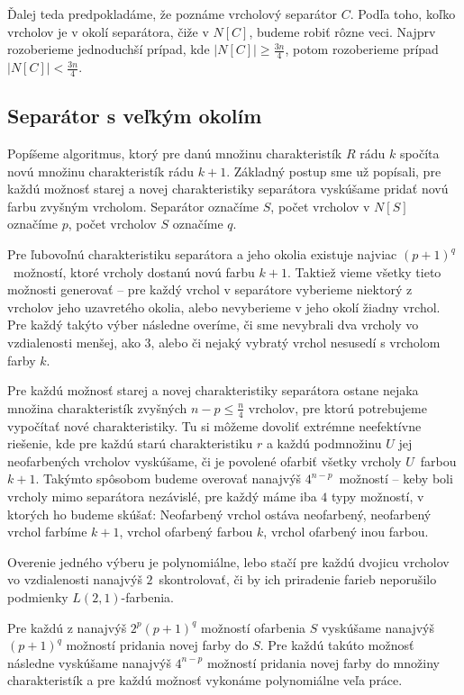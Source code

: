 Ďalej teda predpokladáme, že poznáme vrcholový separátor $C$. Podľa toho, koľko vrcholov je v okolí separátora, čiže
v $N[C]$, budeme robiť rôzne veci. Najprv rozoberieme jednoduchší prípad, kde $|N[C]| \ge \frac{3n}{4}$,
potom rozoberieme prípad $|N[C]| < \frac{3n}{4}$.

\subsection{Separátor s veľkým okolím}

Popíšeme algoritmus, ktorý pre danú množinu charakteristík $R$ rádu $k$ spočíta novú množinu charakteristík
rádu $k+1$. Základný postup sme už popísali, pre každú možnosť starej a novej charakteristiky separátora
vyskúšame pridať novú farbu zvyšným vrcholom. Separátor označíme $S$, počet vrcholov v $N[S]$ označíme $p$, počet
vrcholov $S$ označíme $q$.

Pre ľubovoľnú charakteristiku separátora a jeho okolia existuje najviac $(p+1)^q$ možností, ktoré
vrcholy dostanú novú farbu $k+1$. Taktiež vieme všetky tieto možnosti generovať -- pre každý vrchol v separátore
vyberieme niektorý z vrcholov jeho uzavretého okolia, alebo nevyberieme v jeho okolí žiadny vrchol. Pre
každý takýto výber následne overíme, či sme nevybrali dva vrcholy vo vzdialenosti menšej, ako $3$, alebo
či nejaký vybratý vrchol nesusedí s vrcholom farby $k$.

Pre každú možnosť starej a novej charakteristiky separátora ostane nejaka množina charakteristík
zvyšných $n-p \leq \frac{n}{4}$ vrcholov, pre ktorú potrebujeme vypočítať nové charakteristiky. Tu si môžeme
dovoliť extrémne neefektívne riešenie, kde pre každú starú charakteristiku $r$ a každú podmnožinu $U$
jej neofarbených vrcholov vyskúšame, či je povolené ofarbiť všetky vrcholy $U$ farbou $k+1$. Takýmto
spôsobom budeme overovať nanajvýš $4^{n-p}$ možností -- keby boli vrcholy mimo separátora nezávislé,
pre každý máme iba $4$ typy možností, v ktorých ho budeme skúšať: Neofarbený vrchol ostáva neofarbený,
neofarbený vrchol farbíme $k+1$, vrchol ofarbený farbou $k$, vrchol ofarbený inou farbou.

Overenie
jedného výberu je polynomiálne, lebo stačí pre každú dvojicu vrcholov vo vzdialenosti nanajvýš
$2$ skontrolovať, či by ich priradenie farieb neporušilo podmienky $L(2,1)$-farbenia.

Pre každú z nanajvýš $2^p (p+1)^q$ možností ofarbenia $S$ vyskúšame nanajvýš $(p+1)^q$ možností pridania
novej farby do $S$. Pre každú takúto možnosť následne vyskúšame nanajvýš $4^{n-p}$ možností pridania novej
farby do množiny charakteristík a pre každú možnosť vykonáme polynomiálne veľa práce.

